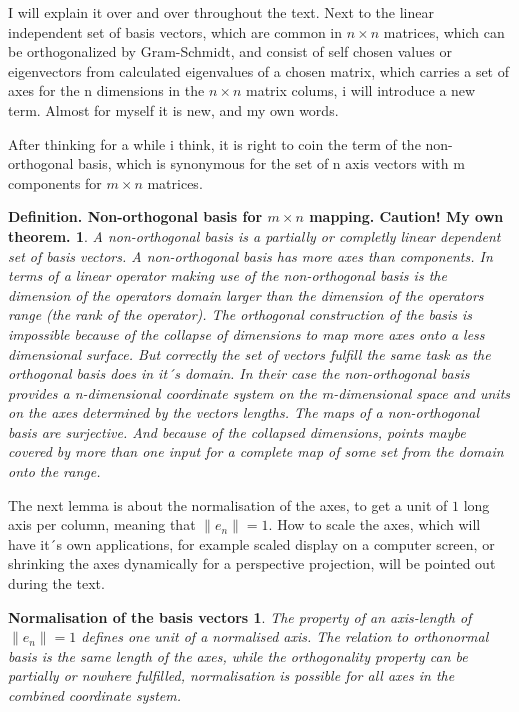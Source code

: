 \documentclass[a4paper]{article}
\begin{document}
I will explain it over and over throughout the text. Next to the linear independent set of basis vectors, which are common in 
$n \times n$ matrices, which can be orthogonalized by Gram-Schmidt, and consist of self chosen values or eigenvectors from 
calculated eigenvalues of a chosen matrix, which carries a set of axes for the n dimensions in the $n \times n$ matrix colums,
i will introduce a new term. Almost for myself it is new, and my own words.

After thinking for a while i think, it is right to coin the term of the non-orthogonal basis, which is synonymous for the set of n 
axis vectors with m components for $m \times n$ matrices.

\newtheorem{Non-orthogonal basis}{Definition. Non-orthogonal basis for $m\times n$ mapping. Caution! My own theorem.}

\begin{Non-orthogonal basis}
A non-orthogonal basis is a partially or completly linear dependent set of basis vectors. A non-orthogonal basis has more axes 
than components. In terms of a linear operator making use of the non-orthogonal basis is the dimension of the operators domain larger 
than the dimension of the operators range (the rank of the operator). The orthogonal construction of the basis is impossible because of the collapse of dimensions to map more axes onto a less dimensional surface. But correctly the set of vectors fulfill the same 
task as the orthogonal basis does in it´s domain. In their case the non-orthogonal basis provides a n-dimensional coordinate system on the m-dimensional space and units on the axes determined by the vectors lengths. The maps of a non-orthogonal basis are 
surjective. And because of the collapsed dimensions, points maybe covered by more than one input for a complete map of some set from the domain onto the range.
\begin{displaymath}
\end{displaymath}
\end{Non-orthogonal basis}

The next lemma is about the normalisation of the axes, to get a unit of $1$ long axis per column, meaning that $\|e_n\| = 1$. How to scale the axes, which will have it´s own applications, for example scaled display on a computer screen, or shrinking the axes dynamically for a perspective projection, will be pointed out during the text.

\newtheorem{normalized_axes}{Normalisation of the basis vectors}
\begin{normalized_axes}
The property of an axis-length of $\|e_n\| = 1$ defines one unit of a normalised axis. The relation to orthonormal basis is the same length of the axes, while the orthogonality property can be partially or nowhere fulfilled, normalisation is possible for all axes in the combined coordinate system.
\begin{displaymath}
\end{displaymath}
\end{normalized_axes}
\end{document}

